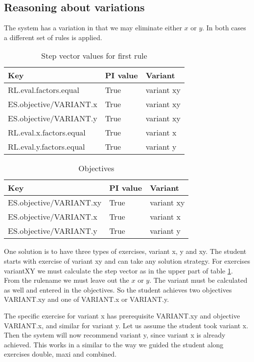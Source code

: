 \subsection{Reasoning about variations}
\label{sec:variat}

The system has a variation in that we may eliminate either $x$ or $y$.
In both cases a different set of rules is applied.
\begin{table}[H]
\begin{tabular}{| l | l | l |}
\hline
Key & PI value& Variant\\
\hline
RL.eval.factors.equal& True& variant xy\\
ES.objective/VARIANT.x& True& variant xy\\
ES.objective/VARIANT.y& True& variant xy\\
\hline
RL.eval.x.factors.equal&True& variant x\\
\hline
RL.eval.y.factors.equal&True& variant y\\
\hline
\end{tabular}
\caption{Step vector values for first rule}
\label{step.1.step}
\end{table}

\begin{table}[H]
\begin{tabular}{| l | l | l |}
\hline
Key & PI value& Variant\\
\hline
ES.objective/VARIANT.xy& True& variant xy\\
\hline
ES.objective/VARIANT.x& True& variant x\\
\hline
ES.objective/VARIANT.y& True& variant y\\
\hline
\end{tabular}
\caption{Objectives}
\label{step.1.obj}
\end{table}


One solution is to have three types of exercises, variant x, y and xy.
The student starts with exercise of variant xy and can take any solution strategy.
For exercises variantXY we must calculate the step vector as in the upper part of table \ref{step.1.step}.
From the rulename we must leave out the $x$ or $y$.
The variant must be calculated as well and entered in the objectives.
So the student achieves two objectives VARIANT.xy and one of VARIANT.x or VARIANT.y.

The specific exercise for variant x has prerequisite VARIANT.xy and objective VARIANT.x, and similar for variant y.
Let us assume the student took variant x.
Then the system will now recommend variant y, since variant x is already achieved.
This works in a similar to the way we guided the student along exercises double, maxi and combined.

